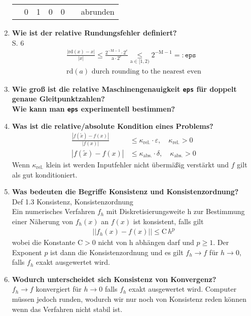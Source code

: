 \begin{enumerate}
\begin{table}[htbp]
\begin{tabular}[htpb]{ccccccl}
				      & 0                   & 1                       & 0                       & 0         &       & abrunden
			\end{tabular}
		\end{table}
		\item \textbf{Wie ist der relative Rundungsfehler definiert?} \\
		S. 6
		\begin{align*}
			\frac{|\text{rd}(x)-x|}{|x|}\leq \frac{2^{-\text{M}-1}\cdot2^e}{\text{a}\cdot 2^e}\underset{\text{a}\in[1,2)}{\leq}2^{-\text{M}-1}=:\texttt{eps} \\
			\text{rd}(a) \text{ durch rounding to the nearest even} 
		\end{align*}
		
		\item \textbf{Wie groß ist die relative Maschinengenauigkeit \texttt{eps} für doppelt genaue Gleitpunktzahlen?\\
					Wie kann man \texttt{eps} experimentell bestimmen?} \\
				
				
		\item \textbf{Was ist die relative/absolute Kondition eines Problems?}
			\begin{align*}
				\frac{|f(\tilde{x})-f(x)|}{|f(x)|} &\leq \kappa_{\text{rel.}}\cdot\varepsilon, \quad \kappa_{\text{rel.}} > 0 \\
				|f(\tilde{x})-f(x)| &\leq \kappa_{\text{abs.}}\cdot\delta, \quad \kappa_{\text{abs.}} > 0
			\end{align*}
		Wenn \(\kappa_{\text{rel.}}\) klein ist werden Inputfehler nicht übermäßig verstärkt und \(f\) gilt als gut konditioniert.
		\item \textbf{Was bedeuten die Begriffe Konsistenz und Konsistenzordnung?} \\
			Def 1.3 Konsistenz, Konsistenzordnung \\
			Ein numerisches Verfahren \(f_h\) mit Diskretisierungsweite h zur Bestimmung einer Näherung von \(f_h(x)\) an \(f(x)\) ist konsistent, falls gilt
			\begin{align*}
				||f_h(x)-f(x)||\leq \text{C}\,h^\text{p}
			\end{align*}
			wobei die Konstante \(\text{C}>0\) nicht von h abhängen darf und \(p\ge1\). Der Exponent \(p\) ist dann die Konsistenzordnung und es gilt \(f_h\rightarrow f\) für \( h \rightarrow 0\), falls \(f_h\) exakt ausgewertet wird. 
		
		\item \textbf{Wodurch unterscheidet sich Konsistenz von Konvergenz?} \\
			\(f_h\rightarrow f\) konvergiert für \( h \rightarrow 0\) falls \(f_h\) exakt ausgewertet wird. Computer müssen jedoch runden, wodurch wir nur noch von Konsistenz reden können wenn das Verfahren nicht stabil ist.
		

\end{enumerate}
